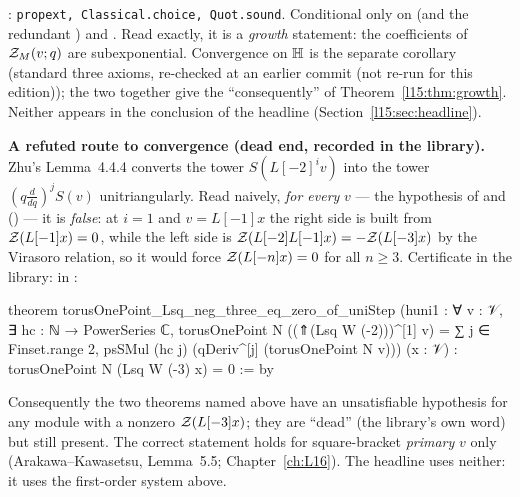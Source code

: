 \begin{status}
: \texttt{propext, Classical.choice, Quot.sound}. Conditional only on 
(and the redundant ) and . Read exactly, it is a \emph{growth} statement: the
coefficients of $\mathcal{Z}_M(v;q)$ are subexponential. Convergence on $\mathbb{H}$ is the separate corollary
 (standard three axioms, re-checked at an earlier commit (not re-run for this edition)); the two together give
the ``consequently'' of Theorem~\ref{l15:thm:growth}. Neither appears in the conclusion of the headline
(Section~\ref{l15:sec:headline}).
\end{status}

\begin{warning}
\textbf{A refuted route to convergence (dead end, recorded in the library).} Zhu's Lemma~4.4.4 converts the tower
$S(L[-2]^iv)$ into the tower $(q\frac d{dq})^jS(v)$ unitriangularly. Read naively, \emph{for every} $v$ --- the
hypothesis  of \allowbreak{} and \allowbreak{}
() --- it is \emph{false}: at $i=1$ and $v=L[-1]x$ the right side is built from
$\mathcal{Z}(L[-1]x)=0$, while the left side is $\mathcal{Z}(L[-2]L[-1]x)=-\mathcal{Z}(L[-3]x)$ by the Virasoro relation, so it would
force $\mathcal{Z}(L[-n]x)=0$ for all $n\ge3$. Certificate in the library: \allowbreak{}\allowbreak{}\allowbreak{}
in :
\begin{leancode}
theorem torusOnePoint_Lsq_neg_three_eq_zero_of_uniStep
    (huni1 : ∀ v : 𝒱, ∃ hc : ℕ → PowerSeries ℂ,
      torusOnePoint N ((⇑(Lsq W (-2)))^[1] v)
        = ∑ j ∈ Finset.range 2, psSMul (hc j) (qDeriv^[j] (torusOnePoint N v)))
    (x : 𝒱) : torusOnePoint N (Lsq W (-3) x) = 0 := by
\end{leancode}
Consequently the two theorems named above have an unsatisfiable hypothesis for any module with a nonzero
$\mathcal{Z}(L[-3]x)$; they are ``dead'' (the library's own word) but still present. The correct statement holds for
square-bracket \emph{primary} $v$ only (Arakawa--Kawasetsu, Lemma~5.5; Chapter~\ref{ch:L16}). The headline uses neither:
it uses the first-order system above.
\end{warning}

